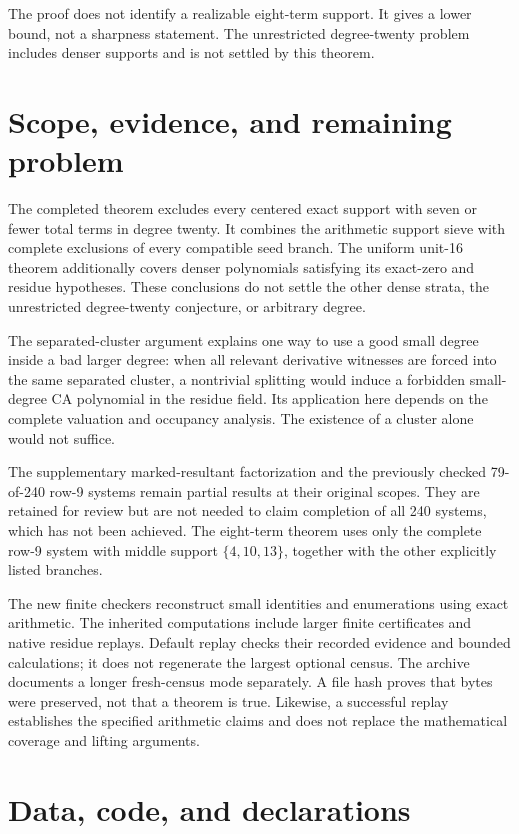 \documentclass[
  british,
  10pt,
  a4paper,
]{article}
\begin{document}
The proof does not identify a realizable eight-term support. It gives a
lower bound, not a sharpness statement. The unrestricted degree-twenty
problem includes denser supports and is not settled by this theorem.

\section{Scope, evidence, and remaining
problem}\label{scope-evidence-and-remaining-problem}

The completed theorem excludes every centered exact support with seven
or fewer total terms in degree twenty. It combines the arithmetic
support sieve with complete exclusions of every compatible seed branch.
The uniform unit-16 theorem additionally covers denser polynomials
satisfying its exact-zero and residue hypotheses. These conclusions do
not settle the other dense strata, the unrestricted degree-twenty
conjecture, or arbitrary degree.

The separated-cluster argument explains one way to use a good small
degree inside a bad larger degree: when all relevant derivative
witnesses are forced into the same separated cluster, a nontrivial
splitting would induce a forbidden small-degree CA polynomial in the
residue field. Its application here depends on the complete valuation
and occupancy analysis. The existence of a cluster alone would not
suffice.

The supplementary marked-resultant factorization and the previously
checked 79-of-240 row-9 systems remain partial results at their original
scopes. They are retained for review but are not needed to claim
completion of all 240 systems, which has not been achieved. The
eight-term theorem uses only the complete row-9 system with middle
support \(\{4,10,13\}\), together with the other explicitly listed
branches.

The new finite checkers reconstruct small identities and enumerations
using exact arithmetic. The inherited computations include larger finite
certificates and native residue replays. Default replay checks their
recorded evidence and bounded calculations; it does not regenerate the
largest optional census. The archive documents a longer fresh-census
mode separately. A file hash proves that bytes were preserved, not that
a theorem is true. Likewise, a successful replay establishes the
specified arithmetic claims and does not replace the mathematical
coverage and lifting arguments.

\section{Data, code, and declarations}\label{data-code-and-declarations}
\end{document}
